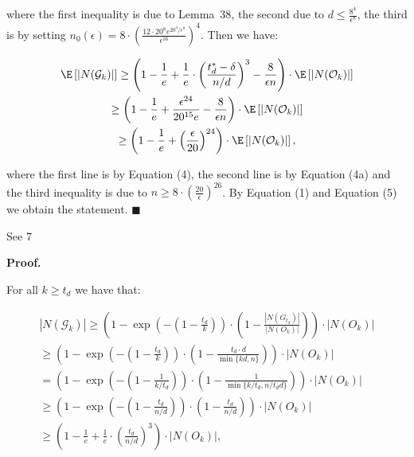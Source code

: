 where the first inequality is due to Lemma 38, the second due to $d\leq\frac{8^{4}}{\epsilon^{8}}$, the third is by setting $n_{0}(\epsilon)=8\cdot\left(\frac{12\cdot 20^{8}e^{20^{4}/\epsilon^{8}}}{\epsilon^{16}}\right)^{4}$.
Then we have:\par


\[\begin{gathered}
\displaystyle\E\left[|N(\mathcal{G}_{k})|\right] \displaystyle\geq\left(1-\frac{1}{e}+\frac{1}{e}\cdot\left(\frac{t^{*}_{d}-\delta}{n/d}\right)^{3}-\frac{8}{\epsilon n}\right)\cdot\E\left[|N(\mathcal{O}_{k})|\right] \\
\displaystyle\geq\left(1-\frac{1}{e}+\frac{\epsilon^{24}}{20^{15}e}-\frac{8}{\epsilon n}\right)\cdot\E\left[|N(\mathcal{O}_{k})|\right] \\
\displaystyle\geq\left(1-\frac{1}{e}+\left(\frac{\epsilon}{20}\right)^{24}\right)\cdot\E\left[|N(\mathcal{O}_{k})|\right],
\end{gathered}\]


where the first line is by Equation (4), the second line is by Equation (4a) and the third inequality is due to $n\geq 8\cdot\left(\frac{20}{\epsilon}\right)^{26}$.
By Equation (1) and Equation (5) we obtain the statement.
\ensuremath{\blacksquare}\par





See 7\par




\par\medskip\noindent\textbf{Proof.}\par



For all $k\geq t_{d}$ we have that:\par


\[\begin{gathered}
\displaystyle|N(\mathcal{G}_{k})| \displaystyle\geq\left(1-\exp\left(-\left(1-\frac{t_{d}}{k}\right)\right)\cdot\left(1-\frac{|N(G_{t_{d}})|}{|N(O_{k})|}\right)\right)\cdot|N(O_{k})| \\
\displaystyle\geq\left(1-\exp\left(-\left(1-\frac{t_{d}}{k}\right)\right)\cdot\left(1-\frac{t_{d}\cdot d}{\min\{kd,n\}}\right)\right)\cdot|N(O_{k})| \\
\displaystyle=\left(1-\exp\left(-\left(1-\frac{1}{k/t_{d}}\right)\right)\cdot\left(1-\frac{1}{\min\{k/t_{d},n/t_{d}d\}}\right)\right)\cdot|N(O_{k})| \\
\displaystyle\geq\left(1-\exp\left(-\left(1-\frac{t_{d}}{n/d}\right)\right)\cdot\left(1-\frac{t_{d}}{n/d}\right)\right)\cdot|N(O_{k})| \\
\displaystyle\geq\left(1-\frac{1}{e}+\frac{1}{e}\cdot\left(\frac{t_{d}}{n/d}\right)^{3}\right)\cdot|N(O_{k})|,
\end{gathered}\]



